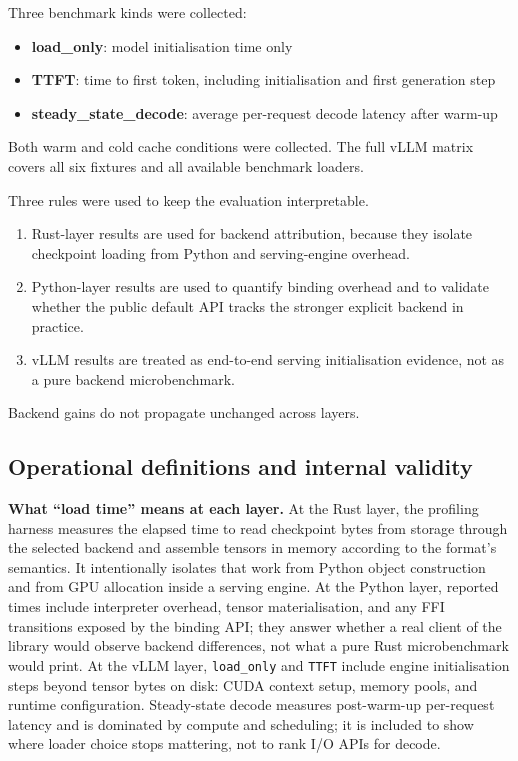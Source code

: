 Three benchmark kinds were collected:

\begin{itemize}
\item \textbf{load\_only}: model initialisation time only
\item \textbf{TTFT}: time to first token, including initialisation and first generation step
\item \textbf{steady\_state\_decode}: average per-request decode latency after warm-up
\end{itemize}

Both warm and cold cache conditions were collected. The full vLLM matrix covers all six fixtures and all available benchmark loaders.

Three rules were used to keep the evaluation interpretable.

\begin{enumerate}
\item Rust-layer results are used for backend attribution, because they isolate checkpoint loading from Python and serving-engine overhead.
\item Python-layer results are used to quantify binding overhead and to validate whether the public default API tracks the stronger explicit backend in practice.
\item vLLM results are treated as end-to-end serving initialisation evidence, not as a pure backend microbenchmark.
\end{enumerate}

Backend gains do not propagate unchanged across layers.

\subsection{Operational definitions and internal validity}

\textbf{What ``load time'' means at each layer.} At the Rust layer, the profiling harness measures the elapsed time to read checkpoint bytes from storage through the selected backend and assemble tensors in memory according to the format's semantics. It intentionally isolates that work from Python object construction and from GPU allocation inside a serving engine. At the Python layer, reported times include interpreter overhead, tensor materialisation, and any FFI transitions exposed by the binding API; they answer whether a real client of the library would observe backend differences, not what a pure Rust microbenchmark would print. At the vLLM layer, \texttt{load\_only} and \texttt{TTFT} include engine initialisation steps beyond tensor bytes on disk: CUDA context setup, memory pools, and runtime configuration. Steady-state decode measures post-warm-up per-request latency and is dominated by compute and scheduling; it is included to show where loader choice stops mattering, not to rank I/O APIs for decode.

